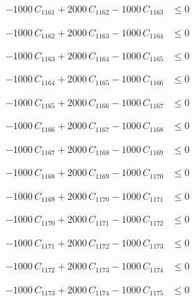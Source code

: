 \documentclass[a4paper,11pt]{article}
\begin{document}
\begin{align}
-1000\,C_{1161} + 2000\,C_{1162} - 1000\,C_{1163} &\leq 0 \nonumber
\end{align}

\begin{align}
-1000\,C_{1162} + 2000\,C_{1163} - 1000\,C_{1164} &\leq 0 \nonumber
\end{align}

\begin{align}
-1000\,C_{1163} + 2000\,C_{1164} - 1000\,C_{1165} &\leq 0 \nonumber
\end{align}

\begin{align}
-1000\,C_{1164} + 2000\,C_{1165} - 1000\,C_{1166} &\leq 0 \nonumber
\end{align}

\begin{align}
-1000\,C_{1165} + 2000\,C_{1166} - 1000\,C_{1167} &\leq 0 \nonumber
\end{align}

\begin{align}
-1000\,C_{1166} + 2000\,C_{1167} - 1000\,C_{1168} &\leq 0 \nonumber
\end{align}

\begin{align}
-1000\,C_{1167} + 2000\,C_{1168} - 1000\,C_{1169} &\leq 0 \nonumber
\end{align}

\begin{align}
-1000\,C_{1168} + 2000\,C_{1169} - 1000\,C_{1170} &\leq 0 \nonumber
\end{align}

\begin{align}
-1000\,C_{1169} + 2000\,C_{1170} - 1000\,C_{1171} &\leq 0 \nonumber
\end{align}

\begin{align}
-1000\,C_{1170} + 2000\,C_{1171} - 1000\,C_{1172} &\leq 0 \nonumber
\end{align}

\begin{align}
-1000\,C_{1171} + 2000\,C_{1172} - 1000\,C_{1173} &\leq 0 \nonumber
\end{align}

\begin{align}
-1000\,C_{1172} + 2000\,C_{1173} - 1000\,C_{1174} &\leq 0 \nonumber
\end{align}

\begin{align}
-1000\,C_{1173} + 2000\,C_{1174} - 1000\,C_{1175} &\leq 0 \nonumber
\end{align}
\end{document}
